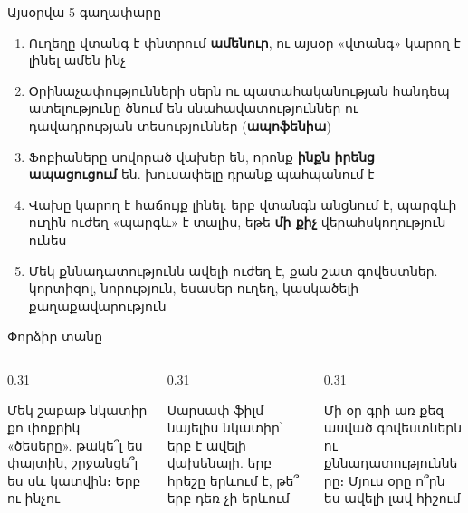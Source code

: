 \notopic

\begin{frame}{Այսօրվա 5 գաղափարը}
  \begin{enumerate}
    \item<1-> Ուղեղը վտանգ է փնտրում \textbf{ամենուր}, ու այսօր «վտանգ» կարող է լինել ամեն ինչ
    \item<2-> Օրինաչափությունների սերն ու պատահականության հանդեպ ատելությունը ծնում են սնահավատություններ ու դավադրության տեսություններ (\textbf{ապոֆենիա})
    \item<3-> Ֆոբիաները սովորած վախեր են, որոնք \textbf{ինքն իրենց ապացուցում} են. խուսափելը դրանք պահպանում է
    \item<4-> Վախը կարող է հաճույք լինել. երբ վտանգն անցնում է, պարգևի ուղին ուժեղ «պարգև» է տալիս, եթե \textbf{մի քիչ} վերահսկողություն ունես
    \item<5-> Մեկ քննադատությունն ավելի ուժեղ է, քան շատ գովեստներ. կորտիզոլ, նորություն, եսասեր ուղեղ, կասկածելի քաղաքավարություն
  \end{enumerate}
\end{frame}

\begin{frame}{Փորձիր տանը}
  \begin{columns}[T]
    \begin{column}{0.31\textwidth}
      \begin{card}[colback=lavender!35!cardwhite]
        \centering{}\par\smallskip
        \raggedright Մեկ շաբաթ նկատիր քո փոքրիկ «ծեսերը». թակե՞լ ես փայտին, շրջանցե՞լ ես սև կատվին։ Երբ ու ինչու
      \end{card}
    \end{column}
    \begin{column}{0.31\textwidth}
      \begin{card}[colback=peach!35!cardwhite]
        \centering{}\par\smallskip
        \raggedright Սարսափ ֆիլմ նայելիս նկատիր՝ երբ է ավելի վախենալի. երբ հրեշը երևում է, թե՞ երբ դեռ չի երևում
      \end{card}
    \end{column}
    \begin{column}{0.31\textwidth}
      \begin{card}[colback=brainpink!25!cardwhite]
        \centering{}\par\smallskip
        \raggedright Մի օր գրի առ քեզ ասված գովեստներն ու քննադատությունները։ Մյուս օրը ո՞րն ես ավելի լավ հիշում
      \end{card}
    \end{column}
  \end{columns}
\end{frame}

